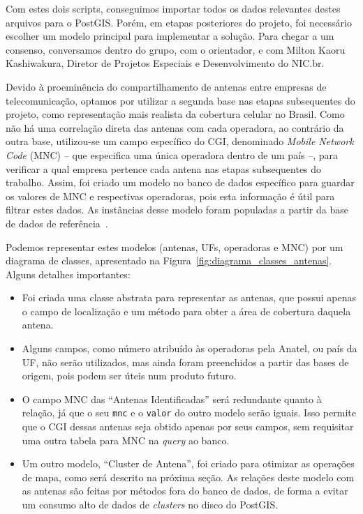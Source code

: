 \documentclass[]{politex}
\begin{document}
Com estes dois scripts, conseguimos importar todos os dados relevantes destes
arquivos para o PostGIS. Porém, em etapas posteriores do projeto, foi necessário
escolher um modelo principal para implementar a solução. Para chegar a um
consenso, conversamos dentro do grupo, com o orientador, e com Milton Kaoru
Kashiwakura, Diretor de Projetos Especiais e Desenvolvimento do NIC.br.

Devido à proeminência do compartilhamento de antenas entre empresas de
telecomunicação, optamos por utilizar a segunda base nas etapas subsequentes do
projeto, como representação mais realista da cobertura celular no Brasil. Como
não há uma correlação direta das antenas com cada operadora, ao contrário da
outra base, utilizou-se um campo específico do CGI, denominado \textit{Mobile
Network Code} (MNC) -- que especifica uma única operadora dentro de um país --,
para verificar a qual empresa pertence cada antena nas etapas subsequentes do
trabalho. Assim, foi criado um modelo no banco de dados específico para guardar
os valores de MNC e respectivas operadoras, pois esta informação é útil para
filtrar estes dados. As instâncias desse modelo foram populadas a partir da base
de dados de referência~\cite{mcc-mnc}.

Podemos representar estes modelos (antenas, UFs, operadoras e MNC) por um
diagrama de classes, apresentado na Figura~\ref{fig:diagrama_classes_antenas}.
Alguns detalhes importantes:

\begin{itemize}

\item Foi criada uma classe abstrata para representar as antenas, que possui
apenas o campo de localização e um método para obter a área de cobertura daquela
antena.

\item Alguns campos, como número atribuído às operadoras pela Anatel, ou país da
UF, não serão utilizados, mas ainda foram preenchidos a partir das bases de
origem, pois podem ser úteis num produto futuro.

\item O campo MNC das ``Antenas Identificadas'' será redundante quanto à
relação, já que o seu \texttt{mnc} e o \texttt{valor} do outro modelo serão
iguais. Isso permite que o CGI dessas antenas seja obtido apenas por seus
campos, sem requisitar uma outra tabela para MNC na \textit{query} ao banco.

\item Um outro modelo, ``Cluster de Antena'', foi criado para otimizar as
operações de mapa, como será descrito na próxima seção. As relações deste modelo
com as antenas são feitas por métodos fora do banco de dados, de forma a evitar
um consumo alto de dados de \textit{clusters} no disco do PostGIS.

\end{itemize}
\end{document}
